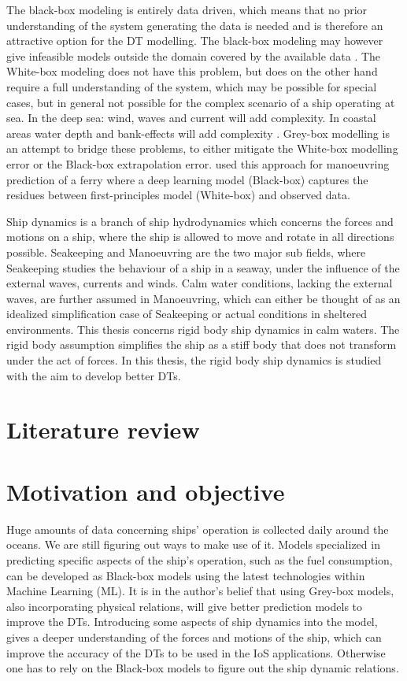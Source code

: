 \noindent The black-box modeling is entirely data driven, which means that no prior understanding of the system generating the data is needed and is therefore an attractive option for the DT modelling. The black-box modeling may however give infeasible models outside the domain covered by the available data \cite{nielsen_machine_2022}. The White-box modeling does not have this problem, but does on the other hand require a full understanding of the system, which may be possible for special cases, but in general not possible for the complex scenario of a ship operating at sea. In the deep sea: wind, waves and current will add complexity. In coastal areas water depth and bank-effects will add complexity \cite{nielsen_machine_2022}. 
\noindent Grey-box modelling is an attempt to bridge these problems, to either mitigate the White-box modelling error or the Black-box extrapolation error. \cite{nielsen_machine_2022} used this approach for manoeuvring prediction of a ferry where a deep learning model (Black-box) captures the residues between first-principles model (White-box) and observed data.

Ship dynamics is a branch of ship hydrodynamics which concerns the forces and motions on a ship, where the ship is allowed to move and rotate in all directions possible. Seakeeping and Manoeuvring are the two major sub fields, where Seakeeping studies the  behaviour of a ship in a seaway, under the influence of the external waves, currents and winds. Calm water conditions, lacking the external waves, are further assumed in Manoeuvring, which can either be thought of as an idealized simplification case of Seakeeping or actual conditions in sheltered environments. This thesis concerns rigid body ship dynamics in calm waters. The rigid body assumption simplifies the ship as a stiff body that does not transform under the act of forces. In this thesis, the rigid body ship dynamics is studied with the aim to develop better DTs.

\section{Literature review}


\section{Motivation and objective}
\label{sec:motivation}
Huge amounts of data concerning ships' operation is collected daily around the oceans. We are still figuring out ways to make use of it. Models specialized in predicting specific aspects of the ship's operation, such as the fuel consumption, can be developed as Black-box models using the latest technologies within Machine Learning (ML). It is in the author's belief that using Grey-box models, also incorporating physical relations, will give better prediction models to improve the DTs. Introducing some aspects of ship dynamics into the model, gives a deeper understanding of the forces and motions of the ship, which can improve the accuracy of the DTs to be used in the IoS applications. Otherwise one has to rely on the Black-box models to figure out the ship dynamic relations. 

